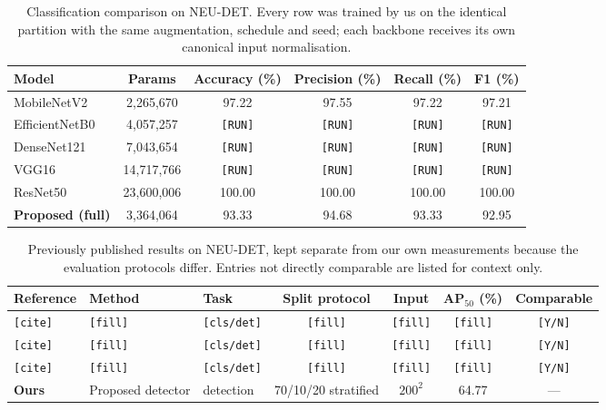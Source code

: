 \begin{table}[t]
\centering
\caption{Classification comparison on NEU-DET. Every row was trained by us on the identical partition with the same augmentation, schedule and seed; each backbone receives its own canonical input normalisation.}
\label{tab:cls_comparison}
\renewcommand{\arraystretch}{1.15}
\begin{tabular}{lccccc}
\toprule
\textbf{Model} & \textbf{Params} & \textbf{Accuracy (\%)} & \textbf{Precision (\%)} & \textbf{Recall (\%)} & \textbf{F1 (\%)} \\
\midrule
MobileNetV2 & 2{,}265{,}670 & 97.22 & 97.55 & 97.22 & 97.21 \\
EfficientNetB0 & 4{,}057{,}257 & \texttt{[RUN]} & \texttt{[RUN]} & \texttt{[RUN]} & \texttt{[RUN]} \\
DenseNet121 & 7{,}043{,}654 & \texttt{[RUN]} & \texttt{[RUN]} & \texttt{[RUN]} & \texttt{[RUN]} \\
VGG16 & 14{,}717{,}766 & \texttt{[RUN]} & \texttt{[RUN]} & \texttt{[RUN]} & \texttt{[RUN]} \\
ResNet50 & 23{,}600{,}006 & 100.00 & 100.00 & 100.00 & 100.00 \\
\midrule
\textbf{Proposed (full)} & 3{,}364{,}064 & 93.33 & 94.68 & 93.33 & 92.95 \\
\bottomrule
\end{tabular}
\end{table}


\begin{table}[t]
\centering
\caption{Previously published results on NEU-DET, kept separate from our own measurements because the evaluation protocols differ. Entries not directly comparable are listed for context only.}
\label{tab:literature}
\renewcommand{\arraystretch}{1.15}
\begin{tabular}{lllcccc}
\toprule
\textbf{Reference} & \textbf{Method} & \textbf{Task} & \textbf{Split protocol} & \textbf{Input} & \textbf{AP$_{50}$ (\%)} & \textbf{Comparable} \\
\midrule
\texttt{[cite]} & \texttt{[fill]} & \texttt{[cls/det]} & \texttt{[fill]} & \texttt{[fill]} & \texttt{[fill]} & \texttt{[Y/N]} \\
\texttt{[cite]} & \texttt{[fill]} & \texttt{[cls/det]} & \texttt{[fill]} & \texttt{[fill]} & \texttt{[fill]} & \texttt{[Y/N]} \\
\texttt{[cite]} & \texttt{[fill]} & \texttt{[cls/det]} & \texttt{[fill]} & \texttt{[fill]} & \texttt{[fill]} & \texttt{[Y/N]} \\
\midrule
\textbf{Ours} & Proposed detector & detection & 70/10/20 stratified & $200^2$ & 64.77 & --- \\
\bottomrule
\end{tabular}
\end{table}


